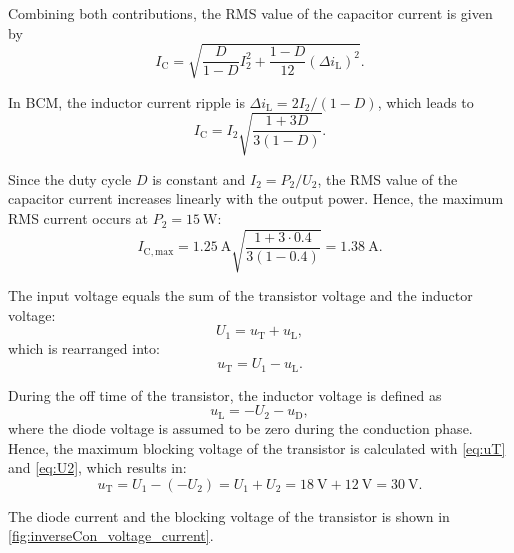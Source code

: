 \begin{solutionblock}
	Combining both contributions, the RMS value of the capacitor
	current is given by
	\begin{equation}
		I_\mathrm{C}
		=
		\sqrt{
			\frac{D}{1-D}I_2^2
			+\frac{1-D}{12}(\Delta i_\mathrm{L})^2
		}.
	\end{equation}

	In BCM, the inductor current ripple is
	$\Delta i_\mathrm{L}=2I_2/(1-D)$, which leads to
	\begin{equation}
		I_\mathrm{C}
		= I_2\sqrt{\frac{1+3D}{3(1-D)}}.
	\end{equation}

	Since the duty cycle $D$ is constant and
	$I_2=P_2/U_2$, the RMS value of the capacitor current
	increases linearly with the output power. Hence, the maximum
	RMS current occurs at $P_2=\SI{15}{\watt}$:
	\begin{equation}
		I_\mathrm{C,max}
		= \SI{1.25}{\ampere}
		\sqrt{\frac{1+3\cdot 0.4}{3(1-0.4)}}
		= \SI{1.38}{\ampere}.
	\end{equation}
\end{solutionblock}


\begin{solutionblock}
	The input voltage equals the sum of the transistor voltage and the inductor voltage:
	\begin{equation}
		U_1 = u_{\mathrm{T}} + u_{\mathrm{L}},
	\end{equation}
	which is rearranged into:
	\begin{equation}
		u_{\mathrm{T}} = U_1 - u_{\mathrm{L}}.
		\label{eq:uT}
	\end{equation}

	During the off time of the transistor, the inductor voltage is defined as
	\begin{equation}
		u_{\mathrm{L}} = -U_2 - u_{\mathrm{D}},
		\label{eq:U2}
	\end{equation}
	where the diode voltage is assumed to be zero during the conduction phase.
	Hence, the maximum blocking voltage of the transistor is calculated with \eqref{eq:uT} and \eqref{eq:U2}, which results in:
	\begin{equation}
		u_{\mathrm{T}} = U_1 - (-U_2)
		= U_1 + U_2 = \SI{18}{\volt} + \SI{12}{\volt} = \SI{30}{\volt}.
	\end{equation}

	The diode current and the blocking voltage of the transistor is shown in \autoref{fig:inverseCon_voltage_current}.
	
\end{solutionblock}

